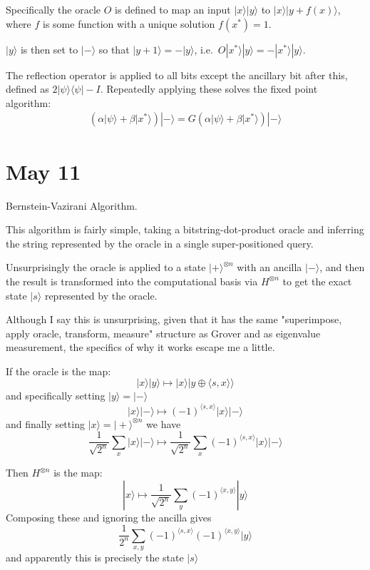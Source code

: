\documentclass[]{article}
\newcommand{\bra}[1]{\langle #1 |}
\newcommand{\ket}[1]{| #1 \rangle}
\begin{document}
Specifically the oracle $O$ is defined to map an input $\ket{x}\ket{y}$ to $\ket{x}\ket{y+f(x)}$, where $f$ is some function with a unique solution $f(x^*) = 1$.

$\ket{y}$ is then set to $\ket{-}$ so that $\ket{y+1} = -\ket{y}$, i.e.\ $O\ket{x^*}\ket{y} = -\ket{x^*}\ket{y}$.

The reflection operator is applied to all bits except the ancillary bit after this, defined as $2\ket{\psi}\bra{\psi}-I$. Repeatedly applying these solves the fixed point algorithm:
\begin{align*}
(\alpha\ket{\psi} + \beta\ket{x^*})\ket{-} = G(\alpha\ket{\psi}+\beta\ket{x^*})\ket{-}
\end{align*}

\section{May 11}

Bernstein-Vazirani Algorithm.

This algorithm is fairly simple, taking a bitstring-dot-product oracle and inferring the string represented by the oracle in a single super-positioned query.

Unsurprisingly the oracle is applied to a state $\ket{+}^{\otimes n}$ with an ancilla $\ket{-}$, and then the result is transformed into the computational basis via $H^{\otimes n}$ to get the exact state $\ket{s}$ represented by the oracle.

Although I say this is unsurprising, given that it has the same "superimpose, apply oracle, transform, measure" structure as Grover and as eigenvalue measurement, the specifics of why it works escape me a little.

If the oracle is the map:
\[\ket{x}\ket{y} \mapsto \ket{x}\ket{y \oplus \langle s, x \rangle}\]
and specifically setting $\ket{y} = \ket{-}$
\[\ket{x}\ket{-} \mapsto (-1)^{\langle s, x \rangle}\ket{x}\ket{-}\]
and finally setting $\ket{x} = \ket{+}^{\otimes n}$ we have
\[\frac{1}{\sqrt{2^n}} \sum_x \ket{x}\ket{-} \mapsto \frac{1}{\sqrt{2^n}} \sum_x (-1)^{\langle s, x \rangle}\ket{x}\ket{-}\]

Then $H^{\otimes n}$ is the map:
\[\ket{x} \mapsto \frac{1}{\sqrt{2^n}}\sum_y (-1)^{\langle x, y \rangle}\ket{y}\]
Composing these and ignoring the ancilla gives
\[\frac{1}{2^n} \sum_{x, y} (-1)^{\langle s, x \rangle}(-1)^{\langle x, y \rangle}\ket{y}\]
and apparently this is precisely the state $\ket{s}$
\end{document}
